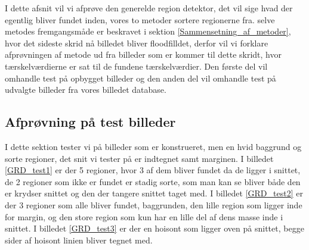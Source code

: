 I dette afsnit vil vi afprøve den generelde region detektor, det vil
sige hvad der egentlig bliver fundet inden, vores to metoder sortere
regionerne fra. selve metodes fremgangsmåde er beskravet i sektion
\ref{Sammensetning_af_metoder}, hvor det sideste skrid nå billedet
bliver floodfilldet, derfor vil vi forklare afprøvningen af metode ud
fra billeder som er kommer til dette skridt, hvor tærskelværdierne er
sat til de fundene tærskelværdier. Den første del vil omhandle test på
opbygget billeder og den anden del vil omhandle test på udvalgte
billeder fra vores billedet database.

\subsection{Afprøvning på test billeder}
I dette sektion tester vi på billeder som er konstrueret, men en hvid
baggrund og sorte regioner, det snit vi tester på er indtegnet samt
marginen. I billedet \ref{GRD_test1} er der 5 regioner, hvor 3 af dem bliver
fundet da de ligger i snittet, de 2 regioner som ikke er fundet er
stadig sorte, som man kan se bliver både den er krydser snittet og den
der tangere snittet taget med. I billedet \ref{GRD_test2} er der 3 regioner som
alle bliver fundet, baggrunden, den lille region som ligger inde for
margin, og den store region som kun har en lille del af dens masse inde
i snittet. I billedet \ref{GRD_test3} er der en hoisont som ligger oven på
snittet, begge sider af hoisont linien bliver tegnet med.


